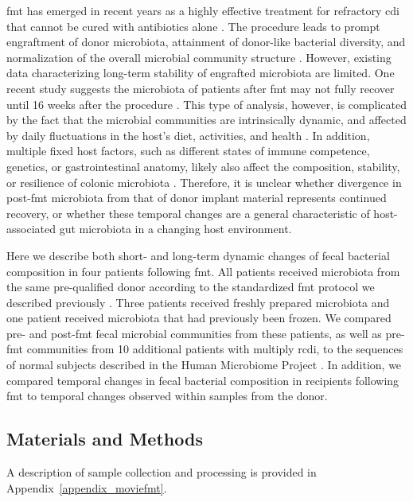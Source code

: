 \Gls{fmt} has emerged in recent years as a highly effective treatment for refractory \gls{cdi} that cannot be cured with antibiotics alone \cite{RN65}. The procedure leads to prompt engraftment of donor microbiota, attainment of donor-like bacterial diversity, and normalization of the overall microbial community structure \cite{RN53moviefmt, RN30, RN66, RN31, RN36, RN4129, RN1}. However, existing data characterizing long-term stability of engrafted microbiota are limited. One recent study suggests the microbiota of patients after \gls{fmt} may not fully recover until 16 weeks after the procedure \cite{RN35moviefmt}. This type of analysis, however, is complicated by the fact that the microbial communities are intrinsically dynamic, and affected by daily fluctuations in the host's diet, activities, and health \cite{RN4235, RN67, RN4195}. In addition, multiple fixed host factors, such as different states of immune competence, genetics, or gastrointestinal anatomy, likely also affect the composition, stability, or resilience of colonic microbiota \cite{RN41, RN74, RN3801, RN73, RN71}. Therefore, it is unclear whether divergence in post-\gls{fmt} microbiota from that of donor implant material represents continued recovery, or whether these temporal changes are a general characteristic of host-associated gut microbiota in a changing host environment.

Here we describe both short- and long-term dynamic changes of fecal bacterial composition in four patients following \gls{fmt}. All patients received microbiota from the same pre-qualified donor according to the standardized \gls{fmt} protocol we described previously \cite{RN45}. Three patients received freshly prepared microbiota and one patient received microbiota that had previously been frozen. We compared pre- and post-\gls{fmt} fecal microbial communities from these patients, as well as pre-\gls{fmt} communities from 10 additional patients with multiply \gls{rcdi}, to the sequences of normal subjects described in the Human Microbiome Project \cite{RN4040}.  In addition, we compared temporal changes in fecal bacterial composition in recipients following \gls{fmt} to temporal changes observed within samples from the donor.

\subsection{Materials and Methods}


A description of sample collection and processing is provided in 
Appendix~\ref{appendix_moviefmt}.

